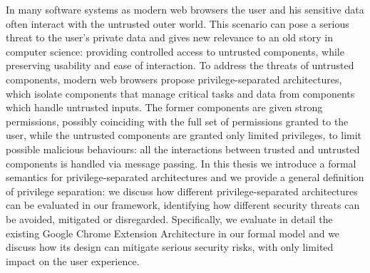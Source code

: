 In many software systems as modern web browsers the user and his sensitive data often interact with the untrusted outer world. This scenario can pose a serious threat to the user's private data and gives new relevance to an old story in computer science: providing controlled access to untrusted components, while preserving usability and ease of interaction. To address the threats of untrusted components, modern web browsers propose privilege-separated architectures, which isolate components that manage critical tasks and data from components which handle untrusted inputs. The former components are given strong permissions, possibly coinciding with the full set of permissions granted to the user, while the untrusted components are granted only limited privileges, to limit possible malicious behaviours: all the interactions between trusted and untrusted components is handled via message passing. In this thesis we introduce a formal semantics for privilege-separated architectures and we provide a general definition of privilege separation: we discuss how different privilege-separated architectures can be evaluated in our framework, identifying how different security threats can be avoided, mitigated or disregarded. Specifically, we evaluate in detail the existing Google Chrome Extension Architecture in our formal model and we discuss how its design can mitigate serious security risks, with only limited impact on the user experience. 
